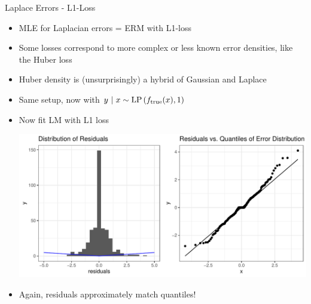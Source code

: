 \documentclass[11pt,compress,t,notes=noshow, xcolor=table]{beamer}
\begin{document}
\begin{vbframe}{Laplace Errors - L1-Loss}
\begin{itemize}
\item MLE for Laplacian errors = ERM with L1-loss 

\item Some losses correspond to more complex or less known error densities, like the Huber loss 

\item Huber density is (unsurprisingly) a hybrid of Gaussian and Laplace

\end{itemize}

\framebreak 

\begin{itemize}
	\item Same setup, now with $y ~|~x \sim \text{LP}\left(f_{\text{true}}(x), 1\right)$ 
\item Now fit LM with L1 loss

\vfill

\includegraphics{figure/residuals_plot_L1.pdf}


\item Again, residuals approximately match quantiles!


\end{itemize}


\end{vbframe}
\end{document}
